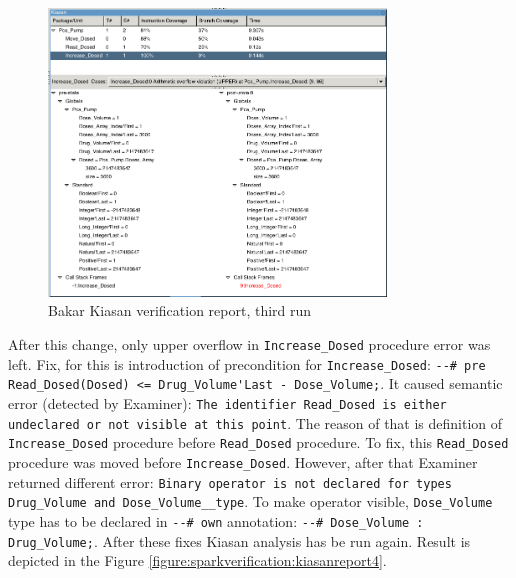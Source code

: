 \begin{figure}[ht]%
    \begin{center}
        \includegraphics[width=0.8\textwidth]{figures/pca-pump-verification-step3.png}        
    \end{center}
    \caption{Bakar Kiasan verification report, third run}
    \label{figure:sparkverification:kiasanreport3}
\end{figure}

After this change, only upper overflow in \lstinline{Increase_Dosed} procedure error was left. Fix, for this is introduction of precondition for \lstinline{Increase_Dosed}: \lstinline{--# pre Read_Dosed(Dosed) <= Drug_Volume'Last - Dose_Volume;}. It caused semantic error (detected by Examiner): \lstinline{The identifier Read_Dosed is either undeclared or not visible at this point}. The reason of that is definition of \lstinline{Increase_Dosed} procedure before \lstinline{Read_Dosed} procedure. To fix, this \lstinline{Read_Dosed} procedure was moved before \lstinline{Increase_Dosed}. However, after that Examiner returned different error: \lstinline{Binary operator is not declared for types Drug_Volume and Dose_Volume__type}. To make operator visible, \lstinline{Dose_Volume} type has to be declared in \lstinline{--# own} annotation: \lstinline{--# Dose_Volume : Drug_Volume;}. After these fixes Kiasan analysis has be run again. Result is depicted in the Figure \ref{figure:sparkverification:kiasanreport4}.

